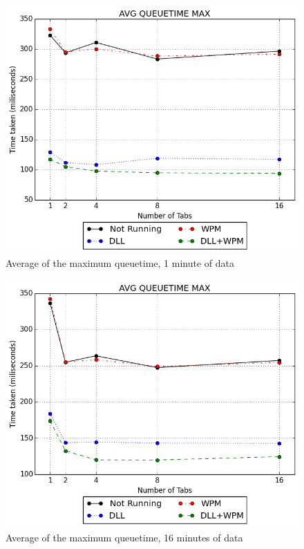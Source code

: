 \begin{figure}[!htbp]
	\centering
    \includegraphics[width=\textwidth,keepaspectratio]{Evaluation/experiment1/AVG-QUEUETIME-MAX-1.png}
    \caption{Average of the maximum queuetime, 1 minute of data}
    \label{fig:ex1_avgqueuetimemax_1}
\end{figure}
\begin{figure}[!htbp]
	\centering
    \includegraphics[width=\textwidth,keepaspectratio]{Evaluation/experiment1/AVG-QUEUETIME-MAX-16.png}
    \caption{Average of the maximum queuetime, 16 minutes of data}
    \label{fig:ex1_avgqueuetimemax_16}
\end{figure}
